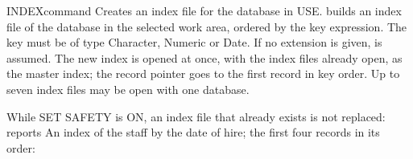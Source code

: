 \begin{XbaseEntry}{INDEX}{command}
Creates an index file for the database in USE.
\Syntax
{}
\Usage
{} builds an index file of the database in the selected work area,
ordered by the key expression.  The key must be of type Character, Numeric
or Date.  If no extension is given,  is assumed.  The new index is
opened at once, with the index files already open, as the master index; the
record pointer goes to the first record in key order.  Up to seven index
files may be open with one database.

While SET SAFETY is ON, an index file that already exists is not replaced:
 reports 
\Examples
An index of the staff by the date of hire; the first four records in its
order:
\end{XbaseEntry}

